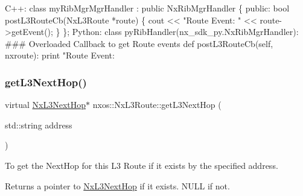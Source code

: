 \begin{DoxyCode}
C++:
   \textcolor{keyword}{class }myRibMgrMgrHandler : \textcolor{keyword}{public} NxRibMgrHandler \{
      \textcolor{keyword}{public}:
         \textcolor{keywordtype}{bool} postL3RouteCb(NxL3Route *route) \{
              cout << \textcolor{stringliteral}{"Route Event: "} << route->getEvent();
         \}
   \};
Python:
   \textcolor{keyword}{class }pyRibHandler(nx\_sdk\_py.NxRibMgrHandler):
\textcolor{preprocessor}{   ### Overloaded Callback to get Route events}
         def postL3RouteCb(self, nxroute):
             print "Route Event: %
\end{DoxyCode}
 \mbox{\label{classnxos_1_1_nx_l3_route_a960a2e429fd7514f0d40e64743e04872}} 
\subsubsection{\texorpdfstring{get\+L3\+Next\+Hop()}{getL3NextHop()}\hspace{0.1cm}{\footnotesize\ttfamily [1/2]}}
{\footnotesize\ttfamily virtual \mbox{\hyperlink{classnxos_1_1_nx_l3_next_hop}{Nx\+L3\+Next\+Hop}}$\ast$ nxos\+::\+Nx\+L3\+Route\+::get\+L3\+Next\+Hop (\begin{DoxyParamCaption}\item[{std\+::string}]{address }\end{DoxyParamCaption})\hspace{0.3cm}{\ttfamily [pure virtual]}}

To get the Next\+Hop for this L3 Route if it exists by the specified address.

\begin{DoxyReturn}{Returns}
a pointer to \mbox{\hyperlink{classnxos_1_1_nx_l3_next_hop}{Nx\+L3\+Next\+Hop}} if it exists. N\+U\+LL if not.
\end{DoxyReturn}

